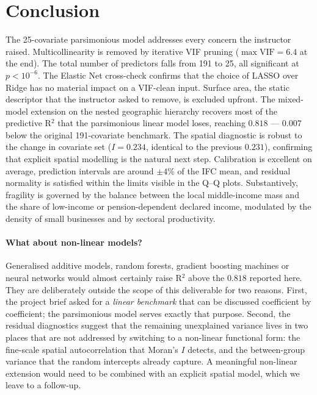 \documentclass[11pt,a4paper]{article}
\begin{document}
\section{Conclusion}

The 25-covariate parsimonious model addresses every concern the
instructor raised. Multicollinearity is removed by iterative VIF
pruning ($\max\mathrm{VIF}=6.4$ at the end). The total number of
predictors falls from 191 to 25, all significant at
$p < 10^{-6}$. The Elastic Net cross-check confirms that the choice
of LASSO over Ridge has no material impact on a VIF-clean input.
Surface area, the static descriptor that the instructor asked to
remove, is excluded upfront. The mixed-model extension on the
nested geographic hierarchy recovers most of the predictive R$^{2}$
that the parsimonious linear model loses, reaching $0.818$ ---
$0.007$ below the original 191-covariate benchmark. The spatial
diagnostic is robust to the change in covariate set
($I = 0.234$, identical to the previous $0.231$), confirming that
explicit spatial modelling is the natural next step. Calibration is
excellent on average, prediction intervals are around $\pm 4\%$ of
the IFC mean, and residual normality is satisfied within the limits
visible in the Q--Q plots. Substantively, fragility is governed by
the balance between the local middle-income mass and the share of
low-income or pension-dependent declared income, modulated by the
density of small businesses and by sectoral productivity.

\paragraph{What about non-linear models?}
Generalised additive models, random forests, gradient boosting
machines or neural networks would almost certainly raise R$^{2}$
above the $0.818$ reported here. They are deliberately outside the
scope of this deliverable for two reasons. First, the project brief
asked for a \emph{linear benchmark} that can be discussed
coefficient by coefficient; the parsimonious model serves exactly
that purpose. Second, the residual diagnostics suggest that the
remaining unexplained variance lives in two places that are not
addressed by switching to a non-linear functional form: the
fine-scale spatial autocorrelation that Moran's $I$ detects, and
the between-group variance that the random intercepts already
capture. A meaningful non-linear extension would need to be
combined with an explicit spatial model, which we leave to a
follow-up.
\end{document}
